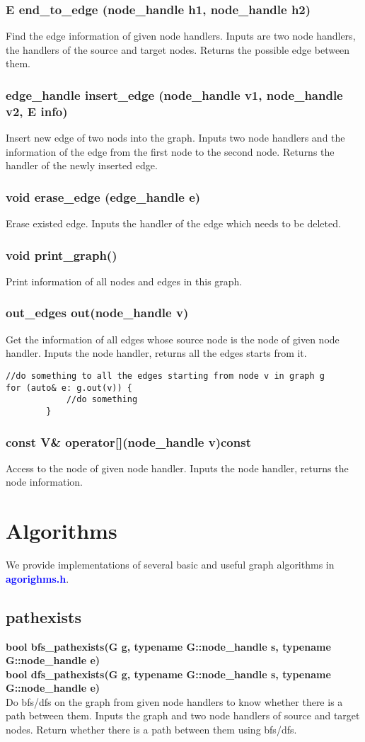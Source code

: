 \documentclass[]{article}
\begin{document}
\subsubsection{E end\_to\_edge (node\_handle h1, node\_handle h2)}
Find the edge information of given node handlers.
Inputs are two node handlers, the handlers of the source and target nodes. Returns the possible edge between them.
\subsubsection{edge\_handle insert\_edge (node\_handle v1, node\_handle v2, E info)}
Insert new edge of two nods into the graph.
Inputs two node handlers and the information of the edge from the first node to the second node. Returns the handler of the newly inserted edge.
\subsubsection{void erase\_edge (edge\_handle e)}
Erase existed edge.
Inputs the handler of the edge which needs to be deleted.
\subsubsection{void print\_graph()}
Print information of all nodes and edges in this graph.
\subsubsection{out\_edges out(node\_handle v)}
Get the information of all edges whose source node is the node of given node handler.
Inputs the node handler, returns all the edges starts from it.
\begin{lstlisting}
//do something to all the edges starting from node v in graph g
for (auto& e: g.out(v)) {
            //do something
        }
\end{lstlisting}
\subsubsection{const V\& operator[](node\_handle v)const}
Access to the node of given node handler.
Inputs the node handler, returns the node information.
\section {Algorithms}
We provide implementations of several basic and useful graph algorithms in \textbf{\textcolor{blue}{agorighms.h}}.
\subsection{pathexists}
\textbf{bool bfs\_pathexists(G g, typename G::node\_handle s, typename G::node\_handle e)}\\
\textbf{bool dfs\_pathexists(G g, typename G::node\_handle s, typename G::node\_handle e)}\\
Do bfs/dfs on the graph from given node handlers to know whether there is a path between them.
Inputs the graph and two node handlers of source and target nodes. Return whether there is a path between them using bfs/dfs.
\end{document}
